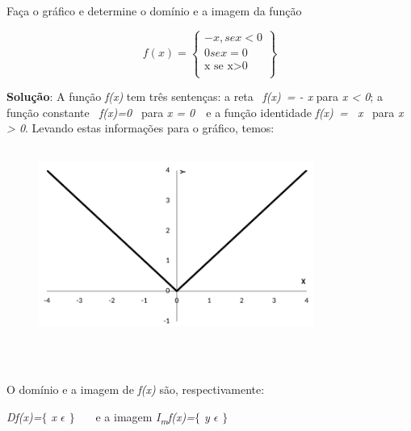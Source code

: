 \begin{texemplo}
Faça o gráfico e determine o domínio e a imagem da função

 \[ f \left( x \right) = \left\{ \begin{matrix}
-x, se x<0\\
0 se x=0\\
\text{x se x>0}\\
\end{matrix}\right\}
\] 

\textbf{Solução}: A função \textit{f(x)} tem três sentenças: a reta~ \textit{f(x)~= - x  }para \textit{x < 0}; a função constante\textit{~ f(x)=0~ }para \textit{x = 0}~~e a função identidade  \textit{f(x)~=~ x  }~para  \textit{x > 0}. Levando estas informações para o gráfico, temos:

\begin{figure}[H]
	\begin{Center}
		\includegraphics[width=3.54in,height=2.48in]{capitulos/outras_funcoes/media/image24.pdf}
	\end{Center}
\end{figure}

~~

\quad O domínio e a imagem de \textit{f(x)} são, respectivamente: 

\textit{Df(x)=$ \{ $ x $ \epsilon $  \textbf{ }$ \} $ }~~~e a imagem  \textit{I\textsubscript{m}f(x)=$ \{ $ y $ \epsilon $  } \textit{$ \} $ }~ \qedsymbol{}
\end{texemplo}

